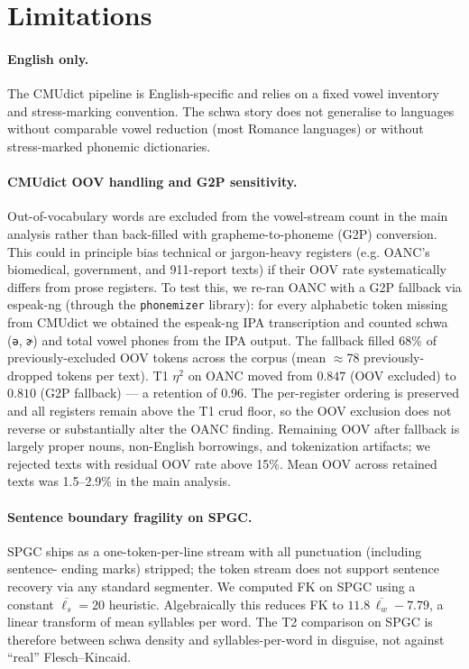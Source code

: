 \documentclass[11pt,a4paper]{article}
\begin{document}
\section{Limitations}

\paragraph{English only.} The CMUdict pipeline is English-specific and
relies on a fixed vowel inventory and stress-marking convention. The
schwa story does not generalise to languages without comparable vowel
reduction (most Romance languages) or without stress-marked phonemic
dictionaries.

\paragraph{CMUdict OOV handling and G2P sensitivity.} Out-of-vocabulary
words are excluded from the vowel-stream count in the main analysis
rather than back-filled with grapheme-to-phoneme (G2P) conversion. This
could in principle bias technical or jargon-heavy registers (e.g.
OANC's biomedical, government, and 911-report texts) if their OOV rate
systematically differs from prose registers. To test this, we re-ran
OANC with a G2P fallback via espeak-ng (through the \texttt{phonemizer}
library): for every alphabetic token missing from CMUdict we obtained
the espeak-ng IPA transcription and counted schwa (\texttt{ə},
\texttt{ɚ}) and total vowel phones from the IPA output. The fallback
filled 68\% of previously-excluded OOV tokens across the corpus (mean
$\approx$78 previously-dropped tokens per text). T1 \(\eta^2\) on OANC
moved from \(0.847\) (OOV excluded) to \(0.810\) (G2P fallback) ---
a retention of \(0.96\). The per-register ordering is preserved and
all registers remain above the T1 crud floor, so the OOV exclusion
does not reverse or substantially alter the OANC finding. Remaining
OOV after fallback is largely proper nouns, non-English borrowings,
and tokenization artifacts; we rejected texts with residual OOV rate
above 15\%. Mean OOV across retained texts was 1.5--2.9\% in the
main analysis.

\paragraph{Sentence boundary fragility on SPGC.} SPGC ships as a
one-token-per-line stream with all punctuation (including sentence-
ending marks) stripped; the token stream does not support sentence
recovery via any standard segmenter. We computed FK on SPGC using a
constant \(\overline{\ell_s}=20\) heuristic. Algebraically this reduces
FK to \(11.8\,\overline{\ell_w} - 7.79\), a linear transform of mean
syllables per word. The T2 comparison on SPGC is therefore between
schwa density and syllables-per-word in disguise, not against ``real''
Flesch--Kincaid.
\end{document}
